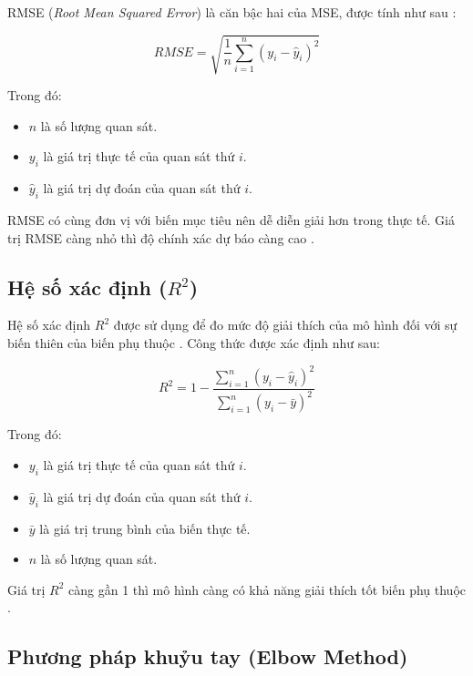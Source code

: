 RMSE (\textit{Root Mean Squared Error}) là căn bậc hai của MSE, được tính như sau \cite{sklearn_userguide}:

\begin{equation}
RMSE = \sqrt{\frac{1}{n} \sum_{i=1}^{n} \left( y_i - \hat{y}_i \right)^2}
\label{eq:rmse}
\end{equation}

Trong đó:
\begin{itemize}
    \item \(n\) là số lượng quan sát.
    \item \(y_i\) là giá trị thực tế của quan sát thứ \(i\).
    \item \(\hat{y}_i\) là giá trị dự đoán của quan sát thứ \(i\).
\end{itemize}

RMSE có cùng đơn vị với biến mục tiêu nên dễ diễn giải hơn trong thực tế. Giá trị RMSE càng nhỏ thì độ chính xác dự báo càng cao \cite{sklearn_userguide}.

\subsection*{\thesubsection\quad Hệ số xác định (\(R^2\))}

Hệ số xác định \(R^2\) được sử dụng để đo mức độ giải thích của mô hình đối với sự biến thiên của biến phụ thuộc \cite{sklearn_userguide}. Công thức được xác định như sau:

\begin{equation}
R^2 = 1 - \frac{\sum_{i=1}^{n} \left( y_i - \hat{y}_i \right)^2}{\sum_{i=1}^{n} \left( y_i - \bar{y} \right)^2}
\label{eq:r2}
\end{equation}

Trong đó:
\begin{itemize}
    \item \(y_i\) là giá trị thực tế của quan sát thứ \(i\).
    \item \(\hat{y}_i\) là giá trị dự đoán của quan sát thứ \(i\).
    \item \(\bar{y}\) là giá trị trung bình của biến thực tế.
    \item \(n\) là số lượng quan sát.
\end{itemize}

Giá trị \(R^2\) càng gần 1 thì mô hình càng có khả năng giải thích tốt biến phụ thuộc \cite{sklearn_userguide}.

\subsection*{\thesubsection\quad Phương pháp khuỷu tay (Elbow Method)}

